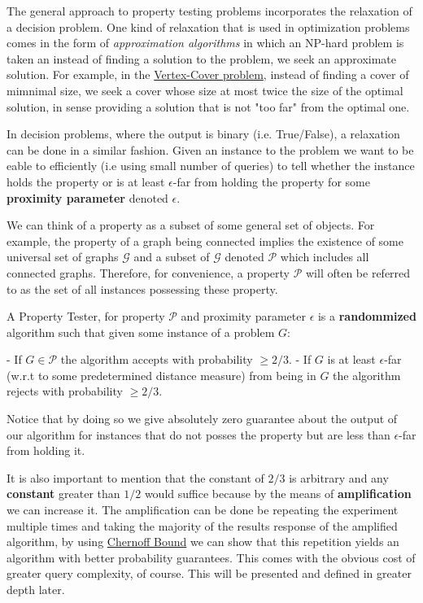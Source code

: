 The general approach to property testing problems incorporates the relaxation of a decision problem. 
One kind of relaxation that is used in optimization problems comes in the form of \emph{approximation algorithms} in which an NP-hard problem is taken an instead of finding a solution to the problem, we seek an approximate solution.
For example, in the \href{https://en.wikipedia.org/wiki/Vertex_cover}{Vertex-Cover problem}, instead of finding a cover of mimnimal size, we seek a cover whose size at most twice the size of the optimal solution, in sense providing a solution that is not "too far" from the optimal one.

In decision problems, where the output is binary (i.e. True/False), a relaxation can be done in a similar fashion. 
Given an instance to the problem we want to be eable to efficiently (i.e using small number of queries) to tell whether the instance holds the property or is at least $\epsilon$-far from holding the property for some \textbf{proximity parameter} denoted $\epsilon$.

We can think of a property as a subset of some general set of objects.
For example, the property of a graph being connected implies the existence of some universal set of graphs $\mathcal{G}$ and a subset of $\mathcal{G}$ denoted $\mathcal{P}$ which includes all connected graphs.
Therefore, for convenience, a property $\mathcal{P}$ will often be referred to as the set of all instances possessing these property.

\begin{definition}\label{def:property_tester}
A Property Tester, for property $\mathcal{P}$ and proximity parameter $\epsilon$ is a \textbf{randommized} algorithm such that given some instance of a problem $G$:

- If $G \in \mathcal{P}$ the algorithm accepts with probability $\geq 2/3$.
- If $G$ is at least $\epsilon$-far (w.r.t to some predetermined distance measure) from being in $G$ the algorithm rejects with probability $\geq 2/3$.
\end{definition}
Notice that by doing so we give absolutely zero guarantee about the output of our algorithm for instances that do not posses the property but are less than $\epsilon$-far from holding it.

It is also important to mention that the constant of $2/3$ is arbitrary and any \textbf{constant} greater than $1/2$ would suffice because by the means of \textbf{amplification} we can increase it.
The amplification can be done be repeating the experiment multiple times and taking the majority of the results response of the amplified algorithm, by using \href{https://en.wikipedia.org/wiki/Chernoff_bound}{Chernoff Bound} we can show that this repetition yields an algorithm with better probability guarantees. 
This comes with the obvious cost of greater query complexity, of course.
This will be presented and defined in greater depth later.

